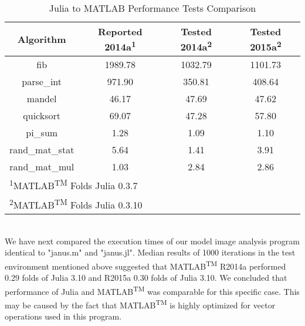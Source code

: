 \begin{table} 
    \begin{tabular}{cccc}
    \hline
        \textbf{Algorithm} & \textbf{Reported 2014a\textsuperscript{1}} & \textbf{Tested  2014a\textsuperscript{2}} & \textbf{Tested 2015a\textsuperscript{2}}\\
        \hline
        fib & 1989.78 & 1032.79 & 1101.73 \\ 
        \hline
        parse\_int & 971.90 & 350.81 & 408.64 \\ 
        \hline
        mandel & 46.17 & 47.69 & 47.62 \\ 
        \hline
        quicksort & 69.07 & 47.28 & 57.80 \\ 
        \hline
        pi\_sum & 1.28 & 1.09 & 1.10 \\ 
        \hline
        rand\_mat\_stat & 5.64 & 1.41 & 3.91 \\ 
        \hline
        rand\_mat\_mul & 1.03 & 2.84 & 2.86 \\
        \hline
        \multicolumn{4}{l}{\textsuperscript{1}MATLAB\textsuperscript{TM} Folds Julia 0.3.7} \\
        \multicolumn{4}{l}{\textsuperscript{2}MATLAB\textsuperscript{TM} Folds Julia 0.3.10} \\
    \end{tabular}
    \caption{Julia to MATLAB Performance Tests Comparison}
\end{table}\\
  
We have next compared the execution times of our model image analysis program identical to "janus.m" and "janus.jl". Median results of 1000 iterations in the test environment mentioned above suggested that MATLAB\textsuperscript{TM} R2014a performed 0.29 folds of Julia 3.10 and R2015a 0.30 folds of Julia 3.10. We concluded that performance of Julia and MATLAB\textsuperscript{TM} was comparable for this specific case. This may be caused by the fact that MATLAB\textsuperscript{TM} is highly optimized for vector operations used in this program.